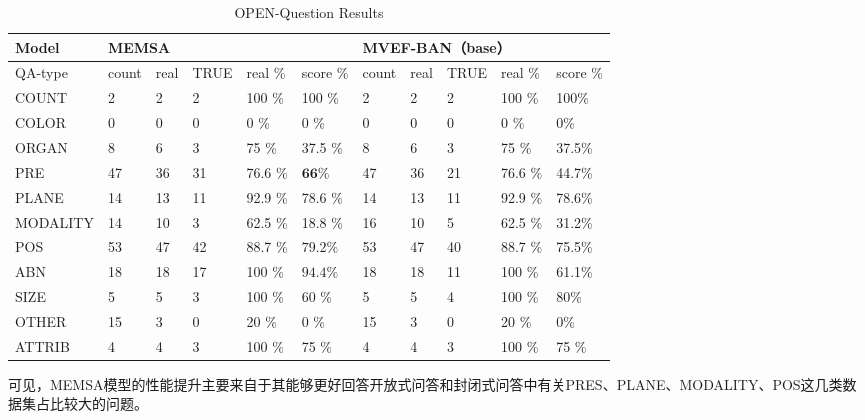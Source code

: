 \begin{table}
	\caption{\label{tab:qt-open-end}OPEN-Question Results}
	\centering
	\small %
	\begin{tabular}{l|lllll|lllll}
		\hline Model & \multicolumn{5}{|l}{\textbf{MEMSA}} & \multicolumn{5}{|l}{\textbf{MVEF-BAN}（base）} \\ 
		\hline QA-type & count & real & TRUE & real \% & score \% & count & real & TRUE & real \% & score \%\\
		\hline COUNT & 2 & 2 & 2 & 100 \%& 100 \%& 2 & 2 & 2 & 100 \%& 100\%\\
		COLOR & 0 & 0 & 0 & 0 \%& 0 \%& 0 & 0 & 0 & 0 \%& 0\%\ \\
		ORGAN & 8 & 6 & 3 & 75 \%& 37.5 \% & 8 & 6 & 3 & 75 \%& 37.5\%\\
		PRE & 47 & 36 & 31 & 76.6 \%& $\mathbf{66 \%}$ & 47 & 36 & 21 & 76.6 \%& 44.7\%\\
		PLANE & 14 & 13 & 11 & 92.9 \%& 78.6 \% & 14 & 13 & 11 & 92.9 \%& 78.6\%\\
		MODALITY & 14 & 10 & 3 & 62.5 \%& 18.8 \% & 16 & 10 & 5 & 62.5 \%& 31.2\%\\
		POS & 53 & 47 & 42 & 88.7 \%& $\mathbf{79.2 \%}$& 53 & 47 & 40 & 88.7 \%& 75.5\%\\
		ABN & 18 & 18 & 17 & 100 \%& $\mathbf{94.4 \%}$& 18 & 18 & 11 & 100 \%& 61.1\%\\
		SIZE & 5 & 5 & 3 & 100 \%& 60 \%& 5 & 5 & 4 & 100 \%& 80\%\\
		OTHER & 15 & 3 & 0 & 20 \%& 0 \%& 15 & 3 & 0 & 20 \%& 0\%\\
		ATTRIB &4 &4 &3 & 100 \%& 75 \%& 4 & 4 & 3 & 100 \%& 75 \% \\
		\hline
		\end{tabular}
\end{table}

可见，MEMSA模型的性能提升主要来自于其能够更好回答开放式问答和封闭式问答中有关PRES、PLANE、MODALITY、POS这几类数据集占比较大的问题。
